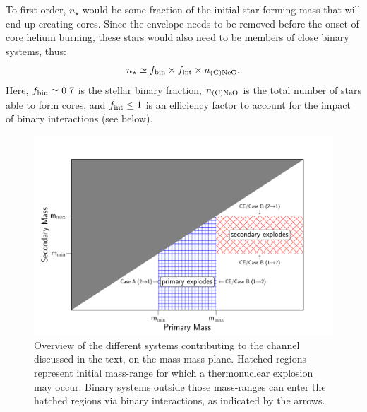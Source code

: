 \documentclass[../../main/thesis_msc.tex]{subfiles}
\begin{document}
To first order, $n_\star$ would be some fraction of the initial star-forming mass that will end up creating    \one cores. Since the  envelope needs to be removed before the onset of core helium burning, these stars would also need to be members of close  binary systems, thus:  
\begin{equation}
n_{\star} \simeq  f_{\rm bin} \times f_{\rm int} \times  n_{\rm \one}.
\end{equation}
Here, $f_{\rm bin}\simeq 0.7$ \citep{Sana:2012px} is the stellar binary fraction,   $n_{\rm \one}$ is the total 
number of stars able to form \one cores, and $f_{\rm int}\leq 1$ is an efficiency factor to account for the impact of binary interactions (see below).
\begin{figure}[htb!]
\begin{center}
\includegraphics[width=1\textwidth]{../figures/chapter3/rates.pdf}
\caption{Overview of the different systems contributing to the \ia channel discussed in the text, on the mass-mass plane. Hatched regions represent initial mass-range for which a thermonuclear explosion may occur. Binary systems outside those mass-ranges can enter the hatched regions via binary interactions, as indicated by the arrows.}
\label{fig:rates}
\end{center}
\end{figure}
\end{document}
